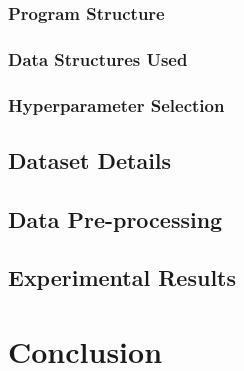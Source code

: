 \documentclass[a4paper]{article}
\begin{document}
\subsubsection{Program Structure}

\subsubsection{Data Structures Used}

\subsubsection{Hyperparameter Selection}\label{ANNhyperparameterselection}



\subsection{Dataset Details}

\subsection{Data Pre-processing}

\subsection{Experimental Results}

\section{Conclusion}

\newpage



\end{document}
